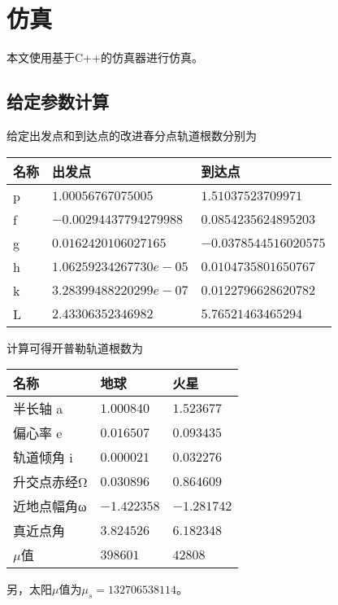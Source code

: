 \section{仿真}
本文使用基于C++的仿真器\cite{olzhn2021}进行仿真。

\subsection{给定参数计算}
给定出发点和到达点的改进春分点轨道根数分别为
\begin{center}\begin{tabular}{lll}
    \toprule
    名称 & 出发点 & 到达点 \\
    \midrule
    p & $1.00056767075005     $ & $1.51037523709971    $ \\
    f & $-0.00294437794279988 $ & $0.0854235624895203  $ \\
    g & $0.0162420106027165   $ & $-0.0378544516020575 $ \\
    h & $1.06259234267730e-05 $ & $0.0104735801650767  $ \\
    k & $3.28399488220299e-07 $ & $0.0122796628620782  $ \\
    L & $2.43306352346982     $ & $5.76521463465294    $ \\
    \bottomrule
\end{tabular}\end{center}
计算可得开普勒轨道根数为
\begin{center}\begin{tabular}{lll}
    \toprule
    名称 & 地球 & 火星 \\
    \midrule
    半长轴    a & $ 1.000840$ & $ 1.523677$ \\
    偏心率    e & $ 0.016507$ & $ 0.093435$ \\
    轨道倾角  i & $ 0.000021$ & $ 0.032276$ \\
    升交点赤经Ω & $ 0.030896$ & $ 0.864609$ \\
    近地点幅角ω & $-1.422358$ & $-1.281742$ \\
    真近点角    & $ 3.824526$ & $ 6.182348$ \\
    $\mu$值     & $398601   $ & $42808    $ \\
    \bottomrule
\end{tabular}\end{center}
另，太阳$\mu$值为$\mu_s=132706538114$。
